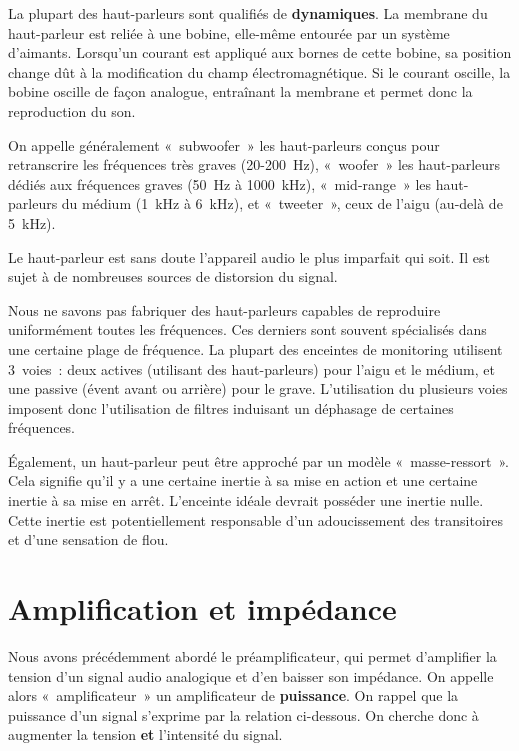 \documentclass[
  letterpaper,
  DIV=11,
  numbers=noendperiod]{scrreprt}
\begin{document}
La plupart des haut-parleurs sont qualifiés de \textbf{dynamiques}. La
membrane du haut-parleur est reliée à une bobine, elle-même entourée par
un système d'aimants. Lorsqu'un courant est appliqué aux bornes de cette
bobine, sa position change dût à la modification du champ
électromagnétique. Si le courant oscille, la bobine oscille de façon
analogue, entraînant la membrane et permet donc la reproduction du son.

On appelle généralement «~subwoofer~» les haut-parleurs conçus pour
retranscrire les fréquences très graves (20-200~Hz), «~woofer~» les
haut-parleurs dédiés aux fréquences graves (50~Hz à 1000~kHz),
«~mid-range~» les haut-parleurs du médium (1~kHz à 6~kHz), et
«~tweeter~», ceux de l'aigu (au-delà de 5~kHz).

Le haut-parleur est sans doute l'appareil audio le plus imparfait qui
soit. Il est sujet à de nombreuses sources de distorsion du signal.

Nous ne savons pas fabriquer des haut-parleurs capables de reproduire
uniformément toutes les fréquences. Ces derniers sont souvent
spécialisés dans une certaine plage de fréquence. La plupart des
enceintes de monitoring utilisent 3~voies~: deux actives (utilisant des
haut-parleurs) pour l'aigu et le médium, et une passive (évent avant ou
arrière) pour le grave. L'utilisation du plusieurs voies imposent donc
l'utilisation de filtres induisant un déphasage de certaines fréquences.

Également, un haut-parleur peut être approché par un modèle
«~masse-ressort~». Cela signifie qu'il y a une certaine inertie à sa
mise en action et une certaine inertie à sa mise en arrêt. L'enceinte
idéale devrait posséder une inertie nulle. Cette inertie est
potentiellement responsable d'un adoucissement des transitoires et d'une
sensation de flou.

\hypertarget{amplification-et-impuxe9dance}{%
\section{Amplification et
impédance}\label{amplification-et-impuxe9dance}}

Nous avons précédemment abordé le préamplificateur, qui permet
d'amplifier la tension d'un signal audio analogique et d'en baisser son
impédance. On appelle alors «~amplificateur~» un amplificateur de
\textbf{puissance}. On rappel que la puissance d'un signal s'exprime par
la relation ci-dessous. On cherche donc à augmenter la tension
\textbf{et} l'intensité du signal.
\end{document}
